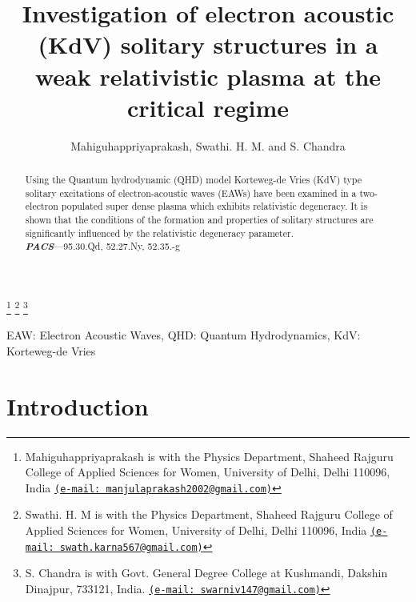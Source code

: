 \documentclass[journal]{IEEEtran}
\begin{document}
\title{Investigation of electron acoustic (KdV) solitary structures in a weak relativistic plasma at the critical regime}
\author{Mahiguhappriyaprakash, Swathi. H. M. and S. Chandra }
\thanks{Mahiguhappriyaprakash is with the Physics Department, Shaheed Rajguru College of Applied Sciences for Women, University of Delhi, Delhi 110096, India \href{mailto:manjulaprakash2002@gmail.com}{\nolinkurl{(e-mail: manjulaprakash2002@gmail.com)}}}
\thanks{Swathi. H. M is with the Physics Department, Shaheed Rajguru College of Applied Sciences for Women, University of Delhi, Delhi 110096, India
 \href{mailto:swath.karna567@gmail.com}{\nolinkurl{(e-mail: swath.karna567@gmail.com)}}}
\thanks{S. Chandra is with Govt. General Degree College at Kushmandi, Dakshin Dinajpur, 733121, India. \href{mailto:swarniv147@gmail.com}{\nolinkurl{(e-mail: swarniv147@gmail.com)}}}

\maketitle

\begin{abstract}

Using the Quantum hydrodynamic (QHD) model Korteweg-de Vries (KdV) type solitary excitations of electron-acoustic waves (EAWs) have been examined in a two-electron populated super dense plasma which exhibits relativistic degeneracy. It is shown that the conditions of the formation and properties of solitary structures are significantly influenced by the relativistic degeneracy parameter.
\\
\textit{\textbf{PACS}}---95.30.Qd, 52.27.Ny, 52.35.-g

\end{abstract}

\begin{IEEEkeywords}
EAW: Electron Acoustic Waves, QHD: Quantum Hydrodynamics, KdV: Korteweg-de Vries
\end{IEEEkeywords}

\section{Introduction}
\end{document}
